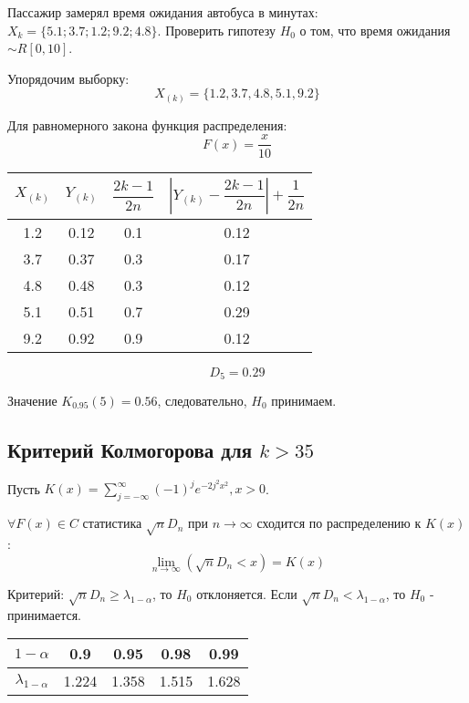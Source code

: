 \begin{ex}
  Пассажир замерял время ожидания автобуса в минутах: $X_k = \{ 5.1; 3.7; 1.2; 9.2; 4.8 \}$.
  Проверить гипотезу $H_0$ о том, что время ожидания $\sim R[0, 10]$.
 
  Упорядочим выборку:
  \[
    X_{(k)} = \{ 1.2, 3.7, 4.8, 5.1, 9.2 \}
  \]

  Для равномерного закона функция распределения:
  \[
    F(x) = \dfrac{x}{10}
  \]

  \begin{center}
    \begin{tabular}{|c|c|c|c|}
      \hline
      $X_{(k)}$ & $Y_{(k)}$ & $\dfrac{2k-1}{2n}$ & $\left| Y_{(k)} - \dfrac{2k-1}{2n} \right| + \dfrac{1}{2n}$ \\
      \hline
      1.2 & 0.12 & 0.1 & 0.12 \\
      3.7 & 0.37 & 0.3 & 0.17 \\
      4.8 & 0.48 & 0.3 & 0.12 \\
      5.1 & 0.51 & 0.7 & 0.29 \\
      9.2 & 0.92 & 0.9 & 0.12 \\
      \hline
    \end{tabular}
  \end{center}

  \[
    D_5 = 0.29
  \]

  Значение $K_{0.95} (5) = 0.56$, следовательно, $H_0$ принимаем.
\end{ex}

\subsection{Критерий Колмогорова для $k>35$}

\begin{theorem}
  Пусть $K(x) = \sum_{j=-\infty}^{\infty} (-1)^j e^{-2j^2 x^2}, x>0$.

  $\forall F(x) \in C$ статистика $\sqrt{n} D_n$ при $n\to\infty$ сходится по распределению к $K(x)$:
  \[
    \lim_{n\to\infty} (\sqrt{n} D_n < x) = K(x)
  \]


  Критерий: $\sqrt{n} D_n \geqslant \lambda_{1-\alpha}$, то $H_0$ отклоняется. Если $\sqrt{n} D_n < \lambda_{1-\alpha}$, то $H_0$ - принимается.

  \begin{center}
    \begin{tabular}{|c|c|c|c|c|}
      \hline
      $1-\alpha$ & 0.9 & 0.95 & 0.98 & 0.99 \\
      \hline
      $\lambda_{1-\alpha}$ & 1.224 & 1.358 & 1.515 & 1.628 \\
      \hline
    \end{tabular}
  \end{center}
\end{theorem}

